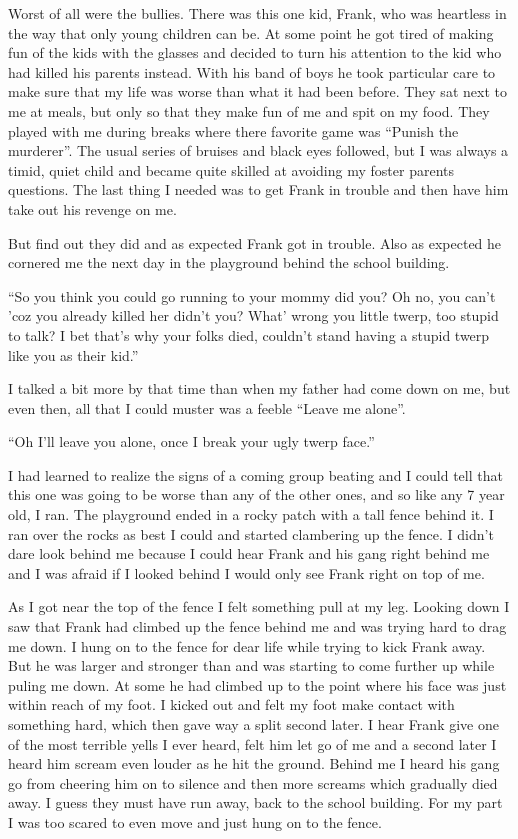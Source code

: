 \documentclass[11pt,letterpaper]{article}
\begin{document}
Worst of all were the bullies. There was this one kid, Frank, who was heartless in the way that only young children can be. At some point he got tired of making fun of the kids with the glasses and decided to turn his attention to the kid who had killed his parents instead. With his band of boys he took particular care to make sure that my life was worse than what it had been before. They sat next to me at meals, but only so that they make fun of me and spit on my food. They played with me during breaks where there favorite game was ``Punish the murderer''. The usual series of bruises and black eyes followed, but I was always a timid, quiet child and became quite skilled at avoiding my foster parents questions. The last thing I needed was to get Frank in trouble and then have him take out his revenge on me.

But find out they did and as expected Frank got in trouble. Also as expected he cornered me the next day in the playground behind the school building.

``So you think you could go running to your mommy did you? Oh no, you can't 'coz you already killed her didn't you? What' wrong you little twerp, too stupid to talk? I bet that's why your folks died, couldn't stand having a stupid twerp like you as their kid.''

I talked a bit more by that time than when my father had come down on me, but even then, all that I could muster was a feeble  ``Leave me alone''.

``Oh I'll leave you alone, once I break your ugly twerp face.''

I had learned to realize the signs of a coming group beating and I could tell that this one was going to be worse than any of the other ones, and so like any 7 year old, I ran. The playground ended in a rocky patch with a tall fence behind it. I ran over the rocks as best I could and started clambering up the fence. I didn't dare look behind me because I could hear Frank and his gang right behind me and I was afraid if I looked behind I would only see Frank right on top of me.

As I got near the top of the fence I felt something pull at my leg. Looking down I saw that Frank had climbed up the fence behind me and was trying hard to drag me down. I hung on to the fence for dear life while trying to kick Frank away. But he was larger and stronger than and was starting to come further up  while puling me down. At some he had climbed up to the point where his face was just within reach of my foot. I kicked out and felt my foot make contact with something hard, which then gave way a split second later. I hear Frank give one of the most terrible yells I ever heard, felt him let go of me and a second later I heard him scream even louder as he hit the ground. Behind me I heard his gang go from cheering him on to silence and then more screams which gradually died away. I guess they must have run away, back to the school building. For my part I was too scared to even move and just hung on to the fence.
\end{document}
